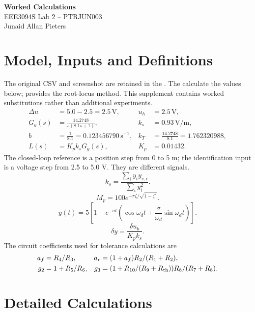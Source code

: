 \documentclass[12pt,a4paper]{article}
\providecommand{\ReportRoot}{../report/}
\numberwithin{equation}{section}
\newcommand{\page}{\clearpage}
\newcommand{\unit}[1]{\,\mathrm{#1}}
\begin{document}
\thispagestyle{plain}

\begin{center}{\LARGE\textbf{Worked Calculations}}\\[4pt]
{\large EEE3094S Lab 2 -- PTRJUN003}\\[4pt]
Junaid Allan Pieters\end{center}
\section{Model, Inputs and Definitions}
The original CSV and screenshot are retained in the . The  calculate the values below;  provides the root-locus method. This supplement contains worked substitutions rather than additional experiments.
\begin{align}
\Delta u&=5.0-2.5=2.5\unit{V}, & u_h&=2.5\unit{V},\\
G_y(s)&=\frac{14.2748}{s(8.1s+1)}, & k_s&=0.93\unit{V/m},\\
b&=\frac1{8.1}=0.123456790\unit{s^{-1}}, & k_T&=\frac{14.2748}{8.1}=1.762320988,\\
L(s)&=K_pk_sG_y(s), & K_p&=0.01432.
\end{align}
The closed-loop reference is a position step from 0 to 5 m; the identification input is a voltage step from 2.5 to 5.0 V. They are different signals.
\begin{equation}\label{eq:sensor}
k_s=\frac{\sum_i y_i y_{v,i}}{\sum_i y_i^2}.
\end{equation}
\begin{equation}\label{eq:overshoot}
M_p=100e^{-\pi\zeta/\sqrt{1-\zeta^2}}.
\end{equation}
\begin{equation}\label{eq:exactstep}
y(t)=5\left[1-e^{-\sigma t}\left(\cos\omega_dt+\frac{\sigma}{\omega_d}\sin\omega_dt\right)\right].
\end{equation}
\begin{equation}\label{eq:bias}
\delta y=\frac{\delta u_b}{K_pk_s}.
\end{equation}
The circuit coefficients used for tolerance calculations are
\begin{align}
a_f&=R_4/R_3,& a_r&=(1+a_f)R_2/(R_1+R_2),\\
g_2&=1+R_5/R_6,&g_3&=(1+R_{10}/(R_9+R_{\rm th}))R_8/(R_7+R_8).
\end{align}
\clearpage
\section{Detailed Calculations}\label{app:calculations}

\page
\end{document}
